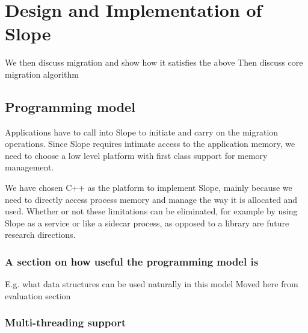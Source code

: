 \chapter{Design and Implementation of Slope}
\label{chap:design}

We then discuss migration and show how it satisfies the above
Then discuss core migration algorithm

\section{Programming model}
\label{sec:platform}


Applications have to call into Slope to initiate and carry on the
migration operations. Since Slope requires intimate access to the application
memory, we need to choose a low level platform with first class support for
memory management.

We have chosen C++ as the platform to implement Slope, mainly because we need
to directly access process memory and manage the way it is allocated and used.
Whether or not these limitations can be eliminated, for example by using Slope
as a service or like a sidecar process, as opposed to a library are future
research directions.

\subsection{A section on how useful the programming model is}
E.g. what data structures can be used naturally in this model
Moved here from evaluation section
\subsection{Multi-threading support}


